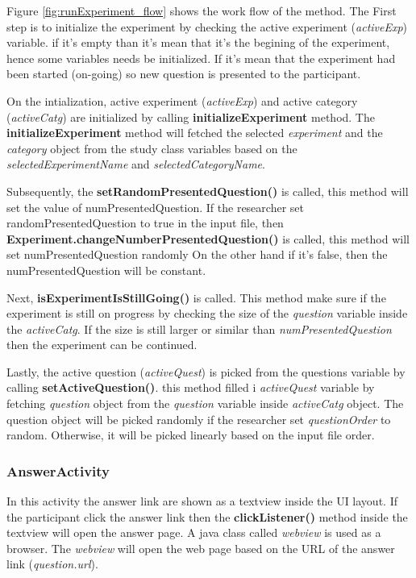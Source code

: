 Figure \ref{fig:runExperiment_flow} shows the work flow of the method. The First step is to initialize the experiment by checking the active experiment (\textit{activeExp}) variable.
 if it's empty than it's mean that it's the begining of the experiment, hence some variables needs be initialized. If it's mean that the experiment had been started (on-going)
 so new question is presented to the participant.


On the intialization, active experiment (\textit{activeExp}) and active category (\textit{activeCatg}) are initialized by calling \textbf{initializeExperiment} method.
The \textbf{initializeExperiment} method will fetched the selected \textit{experiment} and the
\textit{category} object from the study class variables based on the \textit{selectedExperimentName} and \textit{selectedCategoryName}.


Subsequently, the \textbf{setRandomPresentedQuestion()} is called, this method will set the value of numPresentedQuestion.
If the researcher set randomPresentedQuestion to true in the input file, then \textbf{Experiment.changeNumberPresentedQuestion()} is called, this method will set numPresentedQuestion randomly
On the other hand if it's false, then the numPresentedQuestion will be constant.

Next, \textbf{isExperimentIsStillGoing()} is called. This method make sure if the experiment is still on progress by checking the size of the
\textit{question} variable inside the \textit{activeCatg}. If the size is still larger or similar than \textit{numPresentedQuestion} then the experiment can be continued.

Lastly, the active question (\textit{activeQuest}) is picked from the questions variable by calling \textbf{setActiveQuestion()}. this method filled
 i \textit{activeQuest} variable by fetching \textit{question} object from the \textit{question} variable inside \textit{activeCatg} object.
  The question object will be picked randomly if the researcher set \textit{questionOrder} to random. Otherwise, it will be picked linearly based on
  the input file order.


\subsubsection{AnswerActivity}
In this activity the answer link are shown as a textview inside the UI layout. If the participant click the answer
link then the \textbf{clickListener()} method inside the textview will open the answer page.
A java class called \textit{webview} is used as a browser. The \textit{webview} will open the web page based on the URL of the answer link (\textit{question.url}).

